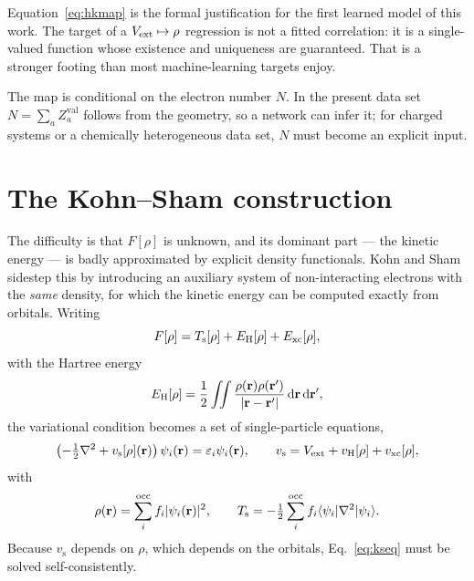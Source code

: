 Equation~\eqref{eq:hkmap} is the formal justification for the first learned
model of this work. The target of a $V_{\mathrm{ext}} \mapsto \rho$ regression is not a
fitted correlation: it is a single-valued function whose existence and
uniqueness are guaranteed. That is a stronger footing than most machine-learning
targets enjoy.

\begin{pwarn}
The map is conditional on the electron number $N$. In the present data set
$N=\sum_a Z^{\mathrm{val}}_a$ follows from the geometry, so a network can infer
it; for charged systems or a chemically heterogeneous data set, $N$ must become
an explicit input.
\end{pwarn}

\section{The Kohn--Sham construction}

The difficulty is that $F[\rho]$ is unknown, and its dominant part --- the
kinetic energy --- is badly approximated by explicit density functionals. Kohn
and Sham sidestep this by introducing an auxiliary system of non-interacting
electrons with the \emph{same} density, for which the kinetic energy can be
computed exactly from orbitals. Writing
\begin{equation}
  F[\rho] = T_{\mathrm{s}}[\rho] + E_{\mathrm{H}}[\rho] + E_{\mathrm{xc}}[\rho],
\end{equation}
with the Hartree energy
\begin{equation}
  E_{\mathrm{H}}[\rho] = \frac{1}{2}\iint
    \frac{\rho(\mathbf{r})\rho(\mathbf{r}')}{|\mathbf{r}-\mathbf{r}'|}\,\mathrm{d}\mathbf{r}\,\mathrm{d}\mathbf{r}',
\end{equation}
the variational condition becomes a set of single-particle equations,
\begin{equation}
  \left(-\tfrac{1}{2}\nabla^2 + v_{\mathrm{s}}[\rho](\mathbf{r})\right)\psi_i(\mathbf{r})
    = \varepsilon_i \psi_i(\mathbf{r}),
  \qquad
  v_{\mathrm{s}} = V_{\mathrm{ext}} + v_{\mathrm{H}}[\rho] + v_{\mathrm{xc}}[\rho],
  \label{eq:kseq}
\end{equation}
with
\begin{equation}
  \rho(\mathbf{r}) = \sum_i^{\mathrm{occ}} f_i |\psi_i(\mathbf{r})|^2,
  \qquad
  T_{\mathrm{s}} = -\tfrac{1}{2}\sum_i^{\mathrm{occ}} f_i
        \langle \psi_i | \nabla^2 | \psi_i \rangle .
\end{equation}
Because $v_{\mathrm{s}}$ depends on $\rho$, which depends on the orbitals,
Eq.~\eqref{eq:kseq} must be solved self-consistently.

